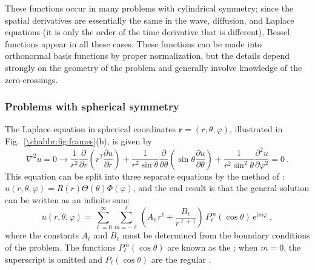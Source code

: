 These functions occur in many problems with cylindrical symmetry; since the spatial derivatives are essentially the same in the wave, diffusion, and Laplace equations (it is only the order of the time derivative that is different), Bessel functions appear in all these cases.  These functions can be made into orthonormal basis functions by proper normalization, but the details depend strongly on the geometry of the problem and generally involve knowledge of the zero-crossings.  



\subsubsection{Problems with spherical symmetry}

The Laplace equation in spherical coordinates $\mathbf{r}=(r,\theta,\varphi)$, illustrated in Fig.~\ref{\chabbr:fig:frames}(b), is given by
\begin{equation}
	\nabla^2u=0\rightarrow \frac{1}{r^2} \frac{\partial}{\partial r} \left( r^2 \frac{\partial u}{\partial r} \right) + \frac{1}{r^2 \sin \theta} \frac{\partial}{\partial \theta} \left( \sin \theta \frac{\partial u}{\partial \theta} \right) + \frac{1}{r^2 \sin^2 \theta} \frac{\partial^2 u}{\partial \varphi^2}=0\ .\label{\chabbr:eq:LaplaceS}
\end{equation}
This equation can be split into three separate equations by the method of : $u(r,\theta,\varphi)=R(r)\Theta(\theta)\Phi(\varphi)$, and the end result is that the general solution can be written as an infinite sum:
\begin{equation}
	u(r,\theta,\varphi) = \sum_{\ell=0}^{\infty}\sum_{m=-\ell}^{\ell} \left(A_\ell\,r^\ell+\frac{B_\ell}{r^{\ell+1}}\right)\,P_{\ell}^{m}(\cos\theta)\,\mathrm{e}^{\mathrm{i}m\varphi}\ ,\label{\chabbr:eq:LapaceSsol}
\end{equation}
where the constants $A_{\ell}$ and $B_{\ell}$ must be determined from the boundary conditions of the problem.  The functions $P_{\ell}^{m}(\cos\theta)$ are known as the ; when $m=0$, the superscript is omitted and $P_{\ell}(\cos\theta)$ are the regular . 

